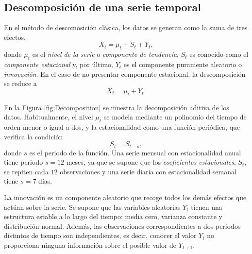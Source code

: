 \documentclass[12pt,twoside]{article}
\begin{document}





\subsection{Descomposición de una serie temporal}
En el método de descomosición clásica, los datos se generan como la suma de tres efectos,
\begin{equation}\label{eq:descom}
    X_t = \mu_t + S_t + Y_t,
\end{equation}
donde $\mu_t$ es el \emph{nivel de la serie} o \emph{componente de tendencia}, $S_t$ es conocido como el \emph{componente estacional} y, por último, $Y_t$ es el componente puramente aleatorio o \emph{innovación}. En el caso de no presentar componente estacional, la descomposición se reduce a 
\begin{equation}\label{eq:descom2}
    X_t = \mu_t + Y_t.
\end{equation}

En la Figura \ref{fig:Decomposition} se muestra la decomposición aditiva  de los datos. Habitualmente, el nivel $\mu_t$ se modela mediante un polinomio del tiempo de orden menor o igual a dos, y la estacionalidad como una función periódica, que verifica la condición
\begin{equation*}
    S_t = S_{t-s},
\end{equation*}
donde $s$ es el periodo de la función. Una serie mensual con estacionalidad anual tiene periodo $s=12$ meses, ya que se supone que los \emph{coeficientes estacionales}, $S_t$, se repiten cada $12$ observaciones y una serie diaria con estacionalidad semanal tiene $s=7$ días.

La innovación es un componente aleatorio que recoge todos los demás efectos que actúan sobre la serie. Se supone que las variables aleatorias $Y_t$ tienen una estructura estable a lo largo del tiempo: media cero, varianza constante y distribución normal. Además, las observaciones correspondientes a dos periodos distintos de tiempo son independientes, es decir, conocer el valor $Y_t$ no proporciona ninguna información sobre el posible valor de $Y_{t+1}$.
\end{document}
